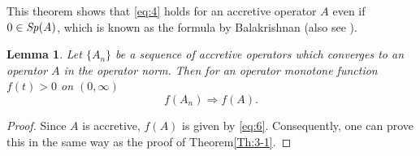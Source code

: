 \documentclass[reqno]{amsart}
\newtheorem{lemma}[theorem]{Lemma}
\theoremstyle{definition}
\newtheorem{corollary}[theorem]{Corollary}
\theoremstyle{remark}
\begin{document}
This theorem shows that \eqref{eq:4} holds for an accretive operator $A$ 
even if $0\in \it{Sp}(A)$, which is known as the formula by Balakrishnan\cite{Bal} (also see 
\cite{Kato-book, N-F}).\par 
\begin{lemma}\label{Le:2}
Let $\{A_n\}$ be a sequence of accretive operators which converges to an operator 
$A$ in the operator norm. Then for an operator monotone function 
$f(t) >0$ on $(0, \infty)$
$$f (A_n) \Longrightarrow f(A).$$
\end{lemma}
\begin{proof} Since $A$ is accretive, $f(A)$ is given by \eqref{eq:6}. Consequently,  
one can prove this in the same way as the proof of Theorem\ref{Th:3-1}.
\end{proof}
%
\end{document}
